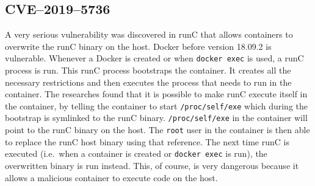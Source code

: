 \subsection{CVE--2019--5736}
A very serious vulnerability was discovered in runC that allows containers to overwrite the runC binary on the host. Docker before version 18.09.2 is vulnerable. Whenever a Docker is created or when \lstinline{docker exec} is used, a runC process is run. This runC process bootstraps the container. It creates all the necessary restrictions and then executes the process that needs to run in the container. The researches found that it is possible to make runC execute itself in the container, by telling the container to start \lstinline{/proc/self/exe} which during the bootstrap is symlinked to the runC binary\cite{CVE-2019-5736-DragonSector}\cite{CVE-2019-5736-Github}. \lstinline{/proc/self/exe} in the container will point to the runC binary on the host. The \lstinline{root} user in the container is then able to replace the runC host binary using that reference. The next time runC is executed (i.e.\ when a container is created or \lstinline{docker exec} is run), the overwritten binary is run instead. This, of course, is very dangerous because it allows a malicious container to execute code on the host.
